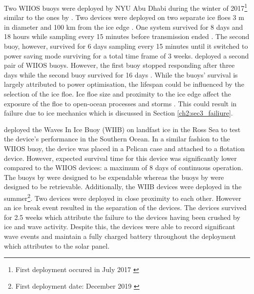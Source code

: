 Two WIIOS buoys were deployed by NYU Abu Dhabi \cite{vichi2019effects,alberello2019drift} during the winter of 2017\footnote{First deployment occured in July 2017 \cite{vichi2019effects,alberello2019drift}} similar to the ones by \cite{kohout2015device}. Two devices were deployed on two separate ice floes 3 m in diameter and 100 km from the ice edge \cite{vichi2019effects,albarello2020drift}. One system survived for 8 days and 18 hours while sampling every 15 minutes before transmission ended \cite{vichi2019effects,albarello2020drift}. The second buoy, however, survived for 6 days sampling every 15 minutes until it switched to power saving mode surviving for a total time frame of 3 weeks. \textcite{vichi2019effects,alberello2019drift} deployed a second pair of WIIOS buoys. However, the first buoy stopped responding after three days while the second buoy survived for 16 days \cite{vichi2019effects}. While the buoys' survival is largely attributed to power optimisation, the lifespan could be influenced by the selection of the ice floe. Ice floe size and proximity to the ice edge affect the exposure of the floe to open-ocean processes and storms \cite{vichi2019effects}. This could result in failure due to ice mechanics which is discussed in Section \ref{ch2:sec3_failiure}. \par 

\textcite{rabault2019open} deployed the Waves In Ice Buoy (WIIB) on landfast ice in the Ross Sea \cite{rabault2020development} to test the device's performance in the Southern Ocean. In a similar fashion to the WIIOS buoy, the device was placed in a Pelican case and attached to a flotation device. However, expected survival time for this device was significantly lower compared to the WIIOS devices: a maximum of 8 days \cite{rabault2019open} of continuous operation. The buoys by \textcite{kohout2015device} were designed to be expendable whereas the buoys by \textcite{rabault2019open} were designed to be retrievable. Additionally, the WIIB devices were deployed in the summer\footnote{First deployment date: December 2019 \cite{rabault2019open}}. Two devices were deployed in close proximity to each other. However an ice break event resulted in the separation of the devices. The devices survived for 2.5 weeks \cite{rabault2019open} which \textcite{rabault2019open} attribute the failure to the devices having been crushed by ice and wave activity. Despite this, the devices were able to record significant wave events and maintain a fully charged battery throughout the deployment which \textcite{rabault2019open} attributes to the solar panel. 

